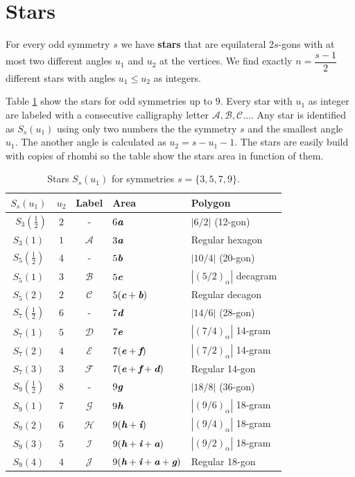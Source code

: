 \documentclass[11pt]{article}
\def\mathbi#1{\textbf{\em #1}}
\begin{document}
\section{Stars}

For every odd symmetry $s$ we have \textbf{stars} that are equilateral 2$s$-gons with at most two different angles $u_1$ and $u_2$ at the vertices. We find exactly $n = \dfrac{s-1}2$ different stars with angles $u_1 \leq u_2$ as integers.

Table \ref{tbl:stars} show the stars for odd symmetries up to $9$. Every star with $u_1$ as integer are labeled with a consecutive calligraphy letter $\mathcal{A}, \mathcal{B}, \mathcal{C}...$.
Any star is identified as $S_s(u_1)$ using only two numbers the the symmetry $s$ and the smallest angle $u_1$. The another angle is calculated as $u_2 = s - u_1 - 1$. The stars are easily build with copies of rhombi so the table show the stars area in function of them.

\begin{table}[H]
\begin{center}
\begin{tabular}{|c|c|c|l|l|}
\hline
$S_s(u_1)$ & $u_2$ & Label & Area & Polygon \\ \hline\
$S_3(\frac{1}2)$ & $2$ & -     & $6\mathbi{a}$ & $|6/2|$ (12-gon) \\[0.5ex]
$S_3(1)$         & $1$ & $\mathcal{A}$ & $3\mathbi{a}$ & Regular hexagon \\[0.5ex]
\hline
$S_5(\frac{1}2)$ & $4$ & -      & $5\mathbi{b}$ & $|10/4|$ (20-gon)\\[0.5ex]
$S_5(1)$ & $3$ & $\mathcal{B}$ & $5\mathbi{c}$ & $|(5/2)_\alpha|$ decagram\\[0.5ex]
$S_5(2)$ & $2$ & $\mathcal{C}$ & $5(\mathbi{c}+\mathbi{b})$ & Regular decagon\\[0.5ex]
\hline
$S_7(\frac{1}2)$ & $6$ & -     & $7\mathbi{d}$ & $|14/6|$ (28-gon)\\[0.5ex]
$S_7(1)$ & $5$ & $\mathcal{D}$ & $7\mathbi{e}$ & $|(7/4)_\alpha|$ 14-gram\\[0.5ex]
$S_7(2)$ & $4$ & $\mathcal{E}$ & $7(\mathbi{e}+\mathbi{f})$ & $|(7/2)_\alpha|$ 14-gram\\[0.5ex]
$S_7(3)$ & $3$ & $\mathcal{F}$ & $7(\mathbi{e}+\mathbi{f}+\mathbi{d})$ & Regular 14-gon\\[0.5ex]
\hline
$S_9(\frac{1}2)$ & $8$ & -     & $9\mathbi{g}$ & $|18/8|$ (36-gon)\\[0.5ex]
$S_9(1)$ & $7$ & $\mathcal{G}$ & $9\mathbi{h}$ & $|(9/6)_\alpha|$ 18-gram\\[0.5ex]
$S_9(2)$ & $6$ & $\mathcal{H}$ & $9(\mathbi{h}+\mathbi{i})$ & $|(9/4)_\alpha|$ 18-gram\\[0.5ex]
$S_9(3)$ & $5$ & $\mathcal{I}$ & $9(\mathbi{h}+\mathbi{i}+\mathbi{a})$ & $|(9/2)_\alpha|$ 18-gram\\[0.5ex]
$S_9(4)$ & $4$ & $\mathcal{J}$ & $9(\mathbi{h}+\mathbi{i}+\mathbi{a}+\mathbi{g})$ & Regular 18-gon\\[0.5ex]
\hline
\end{tabular}
\caption{Stars $S_s(u_1)$ for symmetries $s = \{3,5,7,9\}$.}
\label{tbl:stars}
\end{center}
\end{table}
\end{document}
